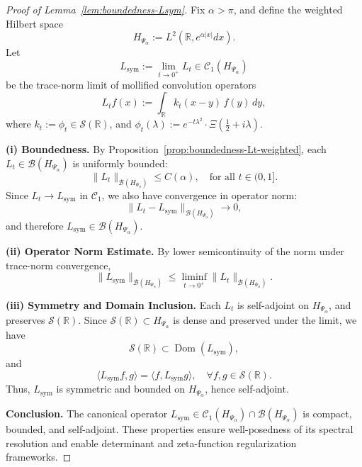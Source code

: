 \begin{proof}[Proof of Lemma~\ref{lem:boundedness-Lsym}]
Fix \( \alpha > \pi \), and define the weighted Hilbert space
\[
H_{\Psi_\alpha} := L^2(\mathbb{R}, e^{\alpha |x|} dx).
\]
Let
\[
L_{\mathrm{sym}} := \lim_{t \to 0^+} L_t \in \mathcal{C}_1(H_{\Psi_\alpha})
\]
be the trace-norm limit of mollified convolution operators
\[
L_t f(x) := \int_{\mathbb{R}} k_t(x - y)\, f(y)\, dy,
\]
where \( k_t := \widehat{\phi_t} \in \mathcal{S}(\mathbb{R}) \), and \( \phi_t(\lambda) := e^{-t\lambda^2} \cdot \Xi\left( \tfrac{1}{2} + i\lambda \right) \).

\medskip
\noindent\textbf{(i) Boundedness.}
By Proposition~\ref{prop:boundedness-Lt-weighted}, each \( L_t \in \mathcal{B}(H_{\Psi_\alpha}) \) is uniformly bounded:
\[
\| L_t \|_{\mathcal{B}(H_{\Psi_\alpha})} \le C(\alpha), \quad \text{for all } t \in (0,1].
\]
Since \( L_t \to L_{\mathrm{sym}} \) in \( \mathcal{C}_1 \), we also have convergence in operator norm:
\[
\| L_t - L_{\mathrm{sym}} \|_{\mathcal{B}(H_{\Psi_\alpha})} \to 0,
\]
and therefore \( L_{\mathrm{sym}} \in \mathcal{B}(H_{\Psi_\alpha}) \).

\medskip
\noindent\textbf{(ii) Operator Norm Estimate.}
By lower semicontinuity of the norm under trace-norm convergence,
\[
\| L_{\mathrm{sym}} \|_{\mathcal{B}(H_{\Psi_\alpha})} \le \liminf_{t \to 0^+} \| L_t \|_{\mathcal{B}(H_{\Psi_\alpha})}.
\]

\medskip
\noindent\textbf{(iii) Symmetry and Domain Inclusion.}
Each \( L_t \) is self-adjoint on \( H_{\Psi_\alpha} \), and preserves \( \mathcal{S}(\mathbb{R}) \). Since \( \mathcal{S}(\mathbb{R}) \subset H_{\Psi_\alpha} \) is dense and preserved under the limit, we have
\[
\mathcal{S}(\mathbb{R}) \subset \operatorname{Dom}(L_{\mathrm{sym}}),
\]
and
\[
\langle L_{\mathrm{sym}} f, g \rangle = \langle f, L_{\mathrm{sym}} g \rangle, \quad \forall f, g \in \mathcal{S}(\mathbb{R}).
\]
Thus, \( L_{\mathrm{sym}} \) is symmetric and bounded on \( H_{\Psi_\alpha} \), hence self-adjoint.

\medskip
\noindent\textbf{Conclusion.}
The canonical operator \( L_{\mathrm{sym}} \in \mathcal{C}_1(H_{\Psi_\alpha}) \cap \mathcal{B}(H_{\Psi_\alpha}) \) is compact, bounded, and self-adjoint. These properties ensure well-posedness of its spectral resolution and enable determinant and zeta-function regularization frameworks.
\end{proof}
